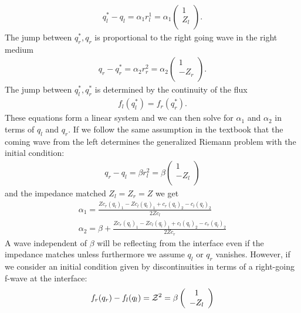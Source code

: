 \documentclass{article}
\begin{document}
\begin{align}
q_l^*-q_l=\alpha_1 r^1_l=\alpha_1   \left( \begin{array}{c}
                      1 \\
                      Z_l \\
                    \end{array}\right).
\end{align}
The jump between $q_r^*,q_r$ is proportional to the right going wave in the right medium
\begin{align}
q_r-q_r^*=\alpha_2 r^2_r=\alpha_2   \left( \begin{array}{c}
                      1 \\
                      -Z_r \\
                    \end{array}\right).
\end{align}
The jump between $q_l^*,q_r^*$ is determined by the continuity of the flux
\begin{align}
f_l(q_l^*)=f_r(q_r^*).
\end{align}
These equations form a linear system and we can then solve for $\alpha_1$ and $\alpha_2$ in terms of $q_l$ and $q_r$. If we follow the same assumption in the textbook that the coming wave from the left determines the generalized Riemann problem with the initial condition:
\begin{align}
q_r-q_l=\beta r^2_l=\beta\left( \begin{array}{c}
                      1 \\
                      -Z_l \\
                    \end{array}\right)
\end{align}
and the impedance matched $Z_l=Z_r=Z$
we get
\begin{align}
\alpha_1=  \frac {Z c_r (q_l)_1 -Z c_l (q_l)_1 + c_r (q_l)_2 - c_l (q_l)_2 }{2 Z c_l}\\
\alpha_2=  \beta+\frac {Z c_r (q_l)_1 -Z c_l (q_l)_1 + c_l (q_l)_2 - c_r (q_l)_2 }{2 Z c_r}
\end{align}
A wave independent of $\beta$ will be reflecting from the interface even if the impedance matches unless furthermore we assume $q_l$ or $q_r$ vanishes. However, if we consider an initial condition given by discontinuities in terms of a right-going f-wave at the interface:
\begin{align}
f_r(q_r)-f_l(q_l)={\cal Z}^2=\beta \left( \begin{array}{c}
                      1 \\
                      -Z_l \\
                    \end{array}\right)
\end{align}
\end{document}
